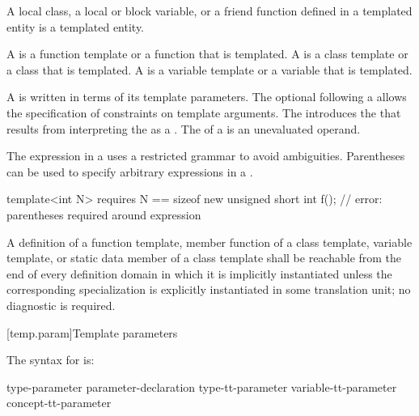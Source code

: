 \begin{note}
A local class, a local or block variable, or a friend function defined in a
templated entity is a templated entity.
\end{note}

A  is
a function template or a function that is templated.
A  is
a class template or a class that is templated.
A  is
a variable template or a variable that is templated.

\pnum
A  is written
in terms of its template parameters.
The optional  following a
 allows the specification of
constraints on template arguments.
The  introduces the
 that results from interpreting
the  as a
.
The  of a
 is an unevaluated operand.
\begin{note}
The expression in a 
uses a restricted grammar to avoid ambiguities.
Parentheses can be used to specify arbitrary expressions
in a .
\begin{example}
\begin{codeblock}
template<int N> requires N == sizeof new unsigned short
int f();            // error: parentheses required around \tcode{==} expression
\end{codeblock}
\end{example}
\end{note}

\pnum
A definition of
a function template,
member function of a class template,
variable template,
or static data member of a class template
shall be reachable from the end of every definition domain
in which it is implicitly instantiated unless the
corresponding specialization is explicitly instantiated
in some translation unit; no diagnostic is required.

[temp.param]{Template parameters}

\pnum
The syntax for
is:

\begin{bnf}
\br
  type-parameter\br
  parameter-declaration\br
  type-tt-parameter\br
  variable-tt-parameter\br
  concept-tt-parameter
\end{bnf}

